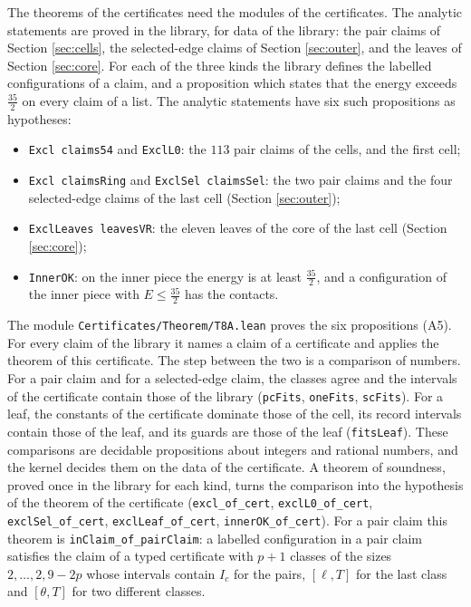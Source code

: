 \documentclass[reqno,a4paper,11pt]{amsart}
\numberwithin{equation}{section}
\newcommand{\lean}[1]{\texttt{#1}}
\newcommand{\file}[1]{\nolinkurl{#1}}
\begin{document}
The theorems of the certificates need the modules of the certificates. The analytic statements are proved in the library, for data of the library: the pair claims of Section \ref{sec:cells}, the selected-edge claims of Section \ref{sec:outer}, and the leaves of Section \ref{sec:core}. For each of the three kinds the library defines the labelled configurations of a claim, and a proposition which states that the energy exceeds $\tfrac{35}{2}$ on every claim of a list. The analytic statements have six such propositions as hypotheses:
\begin{itemize}
    \item \lean{Excl claims54} and \lean{ExclL0}: the $113$ pair claims of the cells, and the first cell;
    \item \lean{Excl claimsRing} and \lean{ExclSel claimsSel}: the two pair claims and the four selected-edge claims of the last cell (Section \ref{sec:outer});
    \item \lean{ExclLeaves leavesVR}: the eleven leaves of the core of the last cell (Section \ref{sec:core});
    \item \lean{InnerOK}: on the inner piece the energy is at least $\tfrac{35}{2}$, and a configuration of the inner piece with $E \leq \tfrac{35}{2}$ has the contacts.
\end{itemize}

The module \file{Certificates/Theorem/T8A.lean} proves the six propositions (A5). For every claim of the library it names a claim of a certificate and applies the theorem of this certificate. The step between the two is a comparison of numbers. For a pair claim and for a selected-edge claim, the classes agree and the intervals of the certificate contain those of the library (\lean{pcFits}, \lean{oneFits}, \lean{scFits}). For a leaf, the constants of the certificate dominate those of the cell, its record intervals contain those of the leaf, and its guards are those of the leaf (\lean{fitsLeaf}). These comparisons are decidable propositions about integers and rational numbers, and the kernel decides them on the data of the certificate. A theorem of soundness, proved once in the library for each kind, turns the comparison into the hypothesis of the theorem of the certificate (\lean{excl\_of\_cert}, \lean{exclL0\_of\_cert}, \lean{exclSel\_of\_cert}, \lean{exclLeaf\_of\_cert}, \lean{innerOK\_of\_cert}). For a pair claim this theorem is \lean{inClaim\_of\_pairClaim}: a labelled configuration in a pair claim satisfies the claim of a typed certificate with $p + 1$ classes of the sizes $2, \dots, 2, 9 - 2p$ whose intervals contain $I_c$ for the pairs, $[\ell, T]$ for the last class and $[\theta, T]$ for two different classes.
\end{document}
